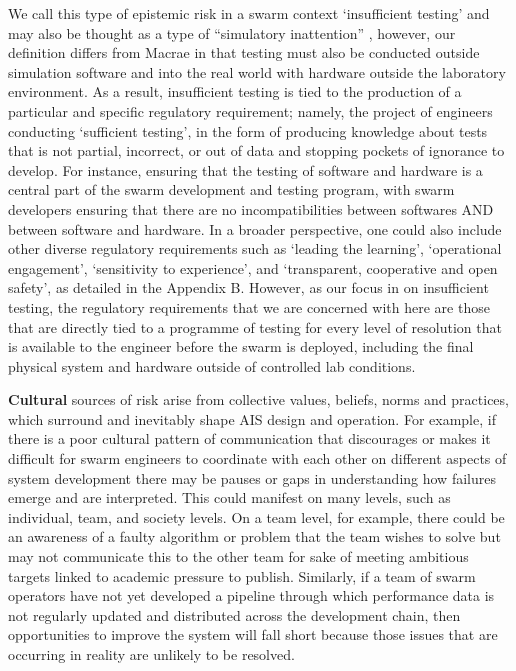 \documentclass[lettersize,journal]{IEEEtran}
\begin{document}
We call this type of epistemic risk in a swarm context `insufficient testing’ and may also be thought as a type of ``simulatory inattention” \cite{macrae2021learning}, however, our definition differs from Macrae in that testing must also be conducted outside simulation software and into the real world with hardware outside the laboratory environment. As a result, insufficient testing is tied to the production of a particular and specific regulatory requirement; namely, the project of engineers conducting `sufficient testing', in the form of producing knowledge about tests that is not partial, incorrect, or out of data and stopping pockets of ignorance to develop. For instance, ensuring that the testing of software and hardware is a central part of the swarm development and testing program, with swarm developers ensuring that there are no incompatibilities between softwares AND between software and hardware. In a broader perspective, one could also include other diverse regulatory requirements such as `leading the learning', `operational engagement’, `sensitivity to experience’, and `transparent, cooperative and open safety’, as detailed in the Appendix B. However, as our focus in on insufficient testing, the regulatory requirements that we are concerned with here are those that are directly tied to a programme of testing for every level of resolution that is available to the engineer before the swarm is deployed, including the final physical system and hardware outside of controlled lab conditions. 

\textbf{Cultural} sources of risk arise from collective values, beliefs, norms and practices, which surround and inevitably shape AIS design and operation. For example, if there is a poor cultural pattern of communication that discourages or makes it difficult for swarm engineers to coordinate with each other on different aspects of system development there may be pauses or gaps in understanding how failures emerge and are interpreted. This could manifest on many levels, such as individual, team, and society levels. On a team level, for example, there could be an awareness of a faulty algorithm or problem that the team wishes to solve but may not communicate this to the other team for sake of meeting ambitious targets linked to academic pressure to publish. Similarly, if a team of swarm operators have not yet developed a pipeline through which performance data is not regularly updated and distributed across the development chain, then opportunities to improve the system will fall short because those issues that are occurring in reality are unlikely to be resolved. 
\end{document}

